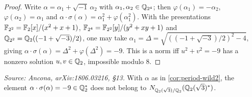 \begin{proof}
  Write \(\alpha = \alpha_1 + \sqrt{-1}\,\alpha_2\) with
  \(\alpha_1, \alpha_2 \in \mathbb{Q}_{2^4}\); then \(\varphi(\alpha_1) = -\alpha_2\),
  \(\varphi(\alpha_2) = \alpha_1\) and \(\alpha \cdot \sigma(\alpha) = \alpha_1^2
  + \varphi(\alpha_1^2)\). With the presentations \(\mathbb{F}_{2^2} = \mathbb{F}_2[x]/(x^2 + x
  + 1)\), \(\mathbb{F}_{2^4} = \mathbb{F}_{2^2}[y]/(y^2 + xy + 1)\) and \(\mathbb{Q}_{2^2} =
  \mathbb{Q}_2((-1+\sqrt{-3})/2)\), one may take \(\alpha_1 = \Delta =
  \sqrt{((-1+\sqrt{-3})/2)^2 - 4}\), giving \(\alpha \cdot \sigma(\alpha) =
  \Delta^2 + \varphi(\Delta^2) = -9\). This is a norm iff \(u^2 + v^2 = -9\) has
  a nonzero solution \(u, v \in \mathbb{Q}_2\), impossible modulo \(8\).
\end{proof}

\begin{lemma}[\(-9\) is not a norm, \(F = \Q_2(\sqrt 3)\)]
  \label{lem:not-norm-wild2}
  \textit{Source: Ancona, arXiv:1806.03216, \S13.}
  With \(\alpha\) as in \cref{cor:period-wild2}, the element
  \(\alpha \cdot \sigma(\alpha) = -9 \in \mathbb{Q}_2^*\) does not belong to
  \(N_{\mathbb{Q}_2(\sqrt 3)/\mathbb{Q}_2}(\mathbb{Q}_2(\sqrt 3)^*)\).
\end{lemma}

